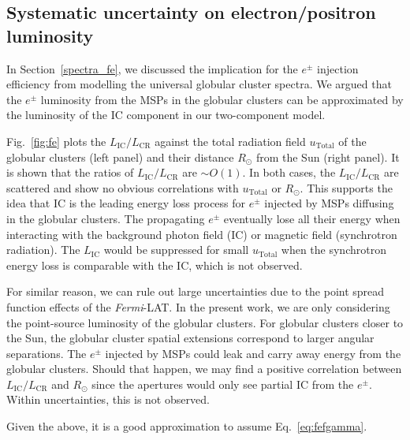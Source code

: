 \documentclass[doublespace,nopageskip]{VTthesis}
\begin{document}
\subsection{Systematic uncertainty on electron/positron luminosity }\label{appx:system_fe}

In Section~\ref{spectra_fe}, we discussed the implication for the $e^\pm$ injection efficiency from modelling the universal globular cluster spectra. We argued that the $e^\pm$ luminosity from the MSPs in the globular clusters can be approximated by the luminosity of the IC component in our two-component model. 

Fig.~\ref{fig:fe} plots the $L_\mathrm{IC}/L_\mathrm{CR}$ against the total radiation field $u_\mathrm{Total}$ of the globular clusters (left panel) and their distance $R_\odot$ from the Sun (right panel). It is shown that the ratios of $L_\mathrm{IC}/L_\mathrm{CR}$ are $\sim O(1)$. In both cases, the $L_\mathrm{IC}/L_\mathrm{CR}$ are scattered and show no obvious correlations with $u_\mathrm{Total}$ or $R_\odot$. This supports the idea that IC is the leading energy loss process for $e^\pm$ injected by MSPs diffusing in the globular clusters. The propagating $e^\pm$ eventually lose all their energy when interacting with the background photon field (IC) or magnetic field (synchrotron radiation). The $L_\mathrm{IC}$ would be suppressed for small $u_\mathrm{Total}$ when the synchrotron energy loss is comparable with the IC, which is not observed. 

For similar reason, we can rule out large uncertainties due to the point spread function effects of the \textit{Fermi}-LAT. In the present work, we are only considering the point-source luminosity of the globular clusters. For globular clusters closer to the Sun, the globular cluster spatial extensions correspond to larger angular separations. The $e^\pm$ injected by MSPs could leak and carry away energy from the globular clusters. Should that happen, we may find a positive correlation between $L_\mathrm{IC}/L_\mathrm{CR}$ and $R_\odot$ since the apertures would only see partial IC from the $e^\pm$. Within uncertainties, this is not observed.

Given the above, it is a good approximation to assume Eq.~\ref{eq:fefgamma}.
\end{document}
